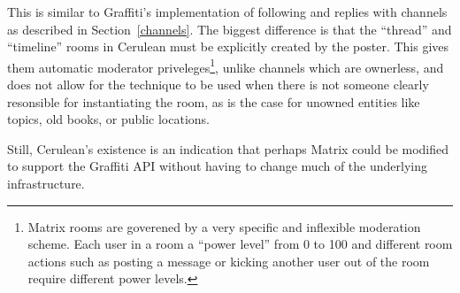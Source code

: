 

This is similar to Graffiti's implementation of following
and replies with channels as described in Section~\ref{channels}.
The biggest difference is that the ``thread'' and ``timeline'' rooms
in Cerulean
must be explicitly created by the poster.
This gives them automatic moderator priveleges\footnote{
    Matrix rooms are goverened by a very specific and inflexible moderation scheme.
    Each user in a room a ``power level'' from 0 to 100 and
    different room actions such as posting a message or kicking
    another user out of the room require different power levels.
},
unlike channels which are ownerless,
and does not allow for the technique to be used
when there is not someone clearly resonsible for instantiating the room,
as is the case for unowned entities like topics, old books, or public locations.

Still, Cerulean's existence is an indication that perhaps
Matrix could be modified to support the Graffiti API without having
to change much of the underlying infrastructure.





